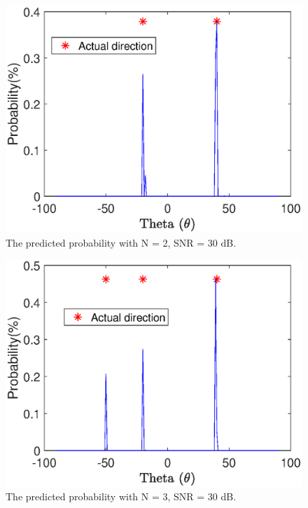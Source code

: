 \documentclass[journal]{IEEEtran}
\begin{document}
\begin{figure}[t]
	\centering
	\includegraphics[width=0.7\linewidth]{N_2_30dB}
	\caption{The predicted probability with N = 2, SNR = 30 dB.}
	\label{fig:N_2_30dB}
\end{figure}     

\begin{figure}[t]
	\centering
	\includegraphics[width=0.7\linewidth]{N_3_30dB}
	\caption{The predicted probability with N = 3, SNR = 30 dB.}
	\label{fig:N_3_30dB}
\end{figure}  



\end{document}
